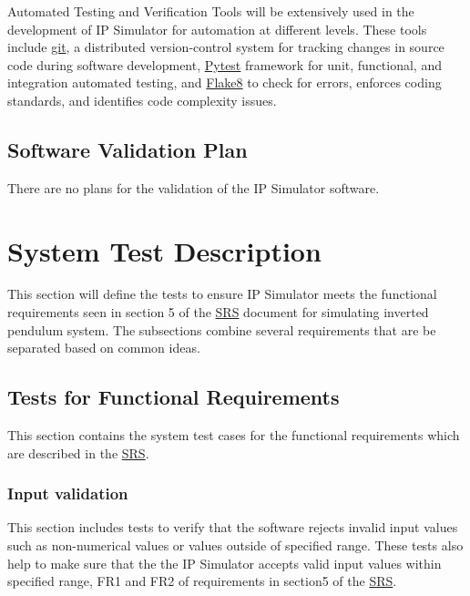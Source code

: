 \documentclass[12pt, titlepage]{article}
\begin{document}
Automated Testing and Verification Tools will be extensively used in the development of IP Simulator for automation at different levels. These tools include \href{https://github.com/MinMah23/CAS741-Project}{git}, a distributed version-control system for tracking changes in source code during software development, \href{https://docs.pytest.org/en/7.2.x/}{Pytest} framework for unit, functional, and integration automated testing, and \href{https://flake8.pycqa.org/en/latest/}{Flake8} to check for errors, enforces coding standards, and identifies code complexity issues.

\subsection{Software Validation Plan}

There are no plans for the validation of the IP Simulator software.

\section{System Test Description}\label{test}
This section will define the tests to ensure IP Simulator meets the functional requirements seen in section 5 of the \href{https://github.com/MinMah23/CAS741-Project/tree/main/docs/SRS/SRS.pdf}{SRS} document for simulating inverted pendulum system. The subsections combine several requirements that are be separated based on common ideas.

\subsection{Tests for Functional Requirements}
This section contains the system test cases for the functional requirements which are described in the  \href{https://github.com/MinMah23/CAS741-Project/tree/main/docs/SRS/SRS.pdf}{SRS}.

\subsubsection{Input validation \label{inp_val}}
This section includes tests to verify that the software rejects invalid input values such as non-numerical values or values outside of specified range. These tests also help to make sure that the the IP Simulator accepts valid input values within specified range, FR1 and FR2 of requirements in section5 of the  \href{https://github.com/MinMah23/CAS741-Project/tree/main/docs/SRS/SRS.pdf}{SRS}.
\end{document}
